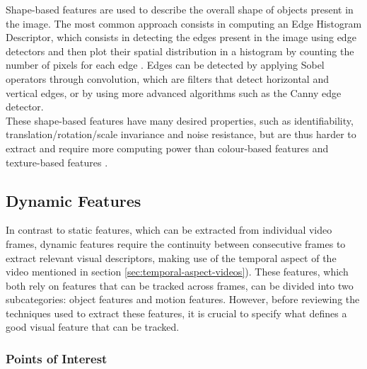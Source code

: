 Shape-based features are used to describe the overall shape of objects present in the image. The most common approach consists in computing an Edge Histogram Descriptor, which consists in detecting the edges present in the image using edge detectors and then plot their spatial distribution in a histogram by counting the number of pixels for each edge \cite{hauptmann2004informedia}. Edges can be detected by applying Sobel operators through convolution, which are filters that detect horizontal and vertical edges, or by using more advanced algorithms such as the Canny edge detector.\\ 

These shape-based features have many desired properties, such as identifiability, translation/rotation/scale invariance and noise resistance, but are thus harder to extract and require more computing power than colour-based features and texture-based features \cite{park2011shapefeatures}.


\subsection{Dynamic Features}
\label{sec:dynamic-features}

In contrast to static features, which can be extracted from individual video frames, dynamic features require the continuity between consecutive frames to extract relevant visual descriptors, making use of the temporal aspect of the video mentioned in section \ref{sec:temporal-aspect-videos}). These features, which both rely on features that can be tracked across frames, can be divided into two subcategories: object features and motion features. However, before reviewing the techniques used to extract these features, it is crucial to specify what defines a good visual feature that can be tracked.

\subsubsection{Points of Interest}

